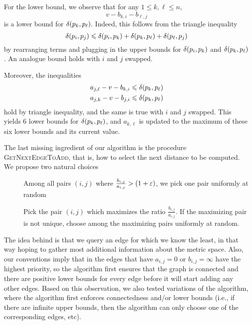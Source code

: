 For the lower bound, we observe that for any $1\leq k,\ell\leq n$,
\[
    v-b_{k,i}-b_{\ell,j}
\]
is a lower bound for $\delta(p_k,p_\ell)$. Indeed, this follows from
the triangle inequality
%
\[\delta(p_i,p_j)\leqslant \delta(p_i,p_k)+\delta(p_k,p_\ell)+\delta(p_\ell,p_j)\]
by rearranging terms and plugging in the upper bounds for $\delta(p_i,p_k)$
and $\delta(p_k,p_\ell)$. An analogue bound holds with $i$ and $j$ swapped. 

Moreover, the inequalities
\begin{align*}
  a_{j,\ell} - v - b_{k,i}&\leqslant \delta(p_k,p_\ell)\\
  a_{j,k} - v - b_{j,i}&\leqslant \delta(p_k,p_\ell)
\end{align*}
hold by triangle inequality, and the same is true with $i$ and $j$ swapped.
This yields $6$ lower bounds for $\delta(p_k,p_\ell)$, and $a_{k,\ell}$
is updated to the maximum of these six lower bounds and its current value.

%
The last missing ingredient of our algorithm is the procedure \textsc{GetNextEdgeToAdd},
that is, how to select the next distance to be computed. We propose two natural choices

\begin{description}
\item[\brndm] Among all pairs $(i,j)$ where $\frac{b_{i,j}}{a_{i,j}}>(1+\varepsilon)$,
we pick one pair uniformly at random
\item[\bgrdy] Pick the pair $(i,j)$ which maximizes the ratio $\frac{b_{i,j}}{a_{i,j}}$.
If the maximizing pair is not unique, choose among the maximizing pairs uniformly at random.
\end{description}
%
The idea behind \bgrdy is that we query an edge for which we know the least,
in that way hoping to gather most additional information about the metric space.
Also, our conventions imply that in \bgrdy the edges that have $a_{i,j} = 0$ or $b_{i,j} = \infty$
have the highest priority, so the algorithm first ensures that the graph is connected and there are positive
lower bounds for every edge before it will start adding any other edges. Based on this observation,
we also tested variations of the \brndm algorithm, where the algorithm
first enforces connectedness and/or lower bounds (i.e., if there are infinite upper bounds,
then the algorithm can only choose one of the corresponding edges, etc).


